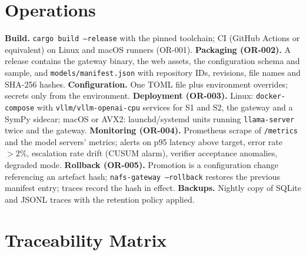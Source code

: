 \documentclass[11pt,a4paper]{article}
\begin{document}
\section{Operations}
\label{sec:ops}
\textbf{Build.} \texttt{cargo build --release} with the pinned toolchain; CI (GitHub Actions or equivalent) on Linux and macOS runners (OR-001). \textbf{Packaging (OR-002).} A release contains the gateway binary, the web assets, the configuration schema and sample, and \texttt{models/manifest.json} with repository IDs, revisions, file names and SHA-256 hashes. \textbf{Configuration.} One TOML file plus environment overrides; secrets only from the environment. \textbf{Deployment (OR-003).} Linux: \texttt{docker-compose} with \texttt{vllm/vllm-openai-cpu} services for S1 and S2, the gateway and a SymPy sidecar; macOS or AVX2: launchd/systemd units running \texttt{llama-server} twice and the gateway. \textbf{Monitoring (OR-004).} Prometheus scrape of \texttt{/metrics} and the model servers' metrics; alerts on p95 latency above target, error rate $>2\%$, escalation rate drift (CUSUM alarm), verifier acceptance anomalies, degraded mode. \textbf{Rollback (OR-005).} Promotion is a configuration change referencing an artefact hash; \texttt{nafs-gateway --rollback} restores the previous manifest entry; traces record the hash in effect. \textbf{Backups.} Nightly copy of SQLite and JSONL traces with the retention policy applied.

\section{Traceability Matrix}
\label{sec:trace}

\end{document}
